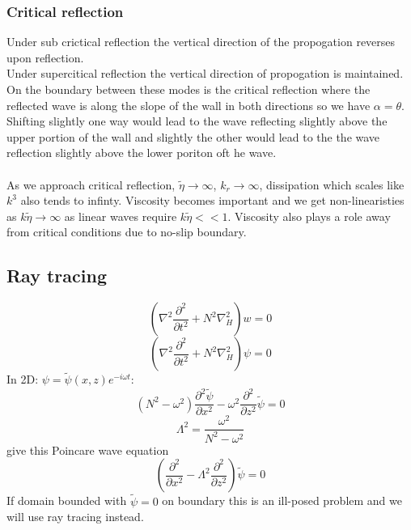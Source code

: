 \documentclass{article}
\begin{document}
\subsubsection{Critical reflection}
Under sub crictical reflection the vertical direction of the propogation reverses upon reflection.\\
Under supercitical reflection the vertical direction of propogation is maintained.\\
On the boundary between these modes is the critical reflection where the reflected wave is along the slope of the wall in both directions so we have $\alpha = \theta$. Shifting slightly one way would lead to the wave reflecting slightly above the upper portion of the wall and slightly the other would lead to the the wave reflection slightly above the lower poriton oft he wave.\\\\
As we approach critical reflection, $\tilde \eta \rightarrow \infty$, $k_r \rightarrow \infty$, dissipation which scales like $k^3$ also tends to infinty. Viscosity becomes important and we get non-linearisties as $k\tilde \eta \rightarrow \infty$ as linear waves require $k \tilde \eta << 1$. Viscosity also plays a role away from critical conditions due to no-slip boundary.
\subsection{Ray tracing}
$$
( \nabla^2 \frac{\partial^2}{\partial t^2} + N^2 \nabla_H^2) w = 0
$$
$$
( \nabla^2 \frac{\partial^2}{\partial t^2} + N^2 \nabla_H^2) \psi = 0
$$
In 2D: $\psi = \tilde \psi(x,z) e^{-i \omega t}$:
$$
(N^2 - \omega^2) \frac{\partial^2 \tilde \psi}{\partial x^2} - \omega^2 \frac{\partial^2}{\partial z^2} \tilde \psi = 0
$$
$$
\Lambda^2 = \frac{\omega^2}{N^2- \omega^2}
$$
give this Poincare wave equation
$$
(\frac{\partial^2}{\partial x^2} - \Lambda^2 \frac{\partial^2}{\partial z^2}) \tilde \psi=0
$$
If domain bounded with $\tilde \psi = 0$ on boundary this is an ill-posed problem and we will use ray tracing instead.
\end{document}
